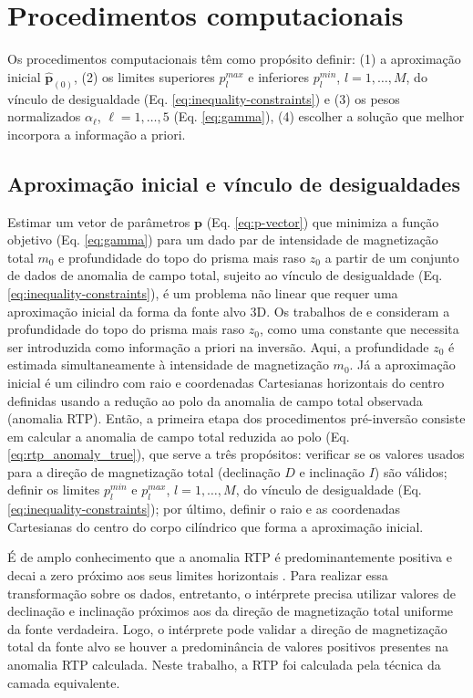 \chapter{Procedimentos computacionais}

Os procedimentos computacionais têm como propósito definir: (1) a aproximação inicial $ \hat{\mathbf{p}}_{(0)} $, (2) os limites superiores $ p_l^{max} $ e inferiores $ p_l^{min} $, $ l=1, \dots, M $, do vínculo de desigualdade (Eq. \ref{eq:inequality-constraints}) e (3) os pesos normalizados $ \alpha_{\ell} $, $ \ell=1,\dots,5 $ (Eq. \ref{eq:gamma}), (4) escolher a solução que melhor incorpora a informação a priori. 

\section{Aproximação inicial e vínculo de desigualdades}

Estimar um vetor de parâmetros $\mathbf{p}$ (Eq. \ref{eq:p-vector}) que minimiza a função objetivo (Eq. \ref{eq:gamma}) para um dado par de intensidade de magnetização total $ m_0 $ e profundidade do topo do prisma mais raso $ z_0 $ a partir de um conjunto de dados de anomalia de campo total, sujeito ao vínculo de desigualdade (Eq. \ref{eq:inequality-constraints}), é um problema não linear que requer uma aproximação inicial da forma da fonte alvo 3D. 
Os trabalhos de \cite{oliveirajr_etal2011} e \cite{oliveirajr_barbosa2013} consideram a profundidade do topo do prisma mais raso $ z_0 $, como uma constante que necessita ser introduzida como informação a priori na inversão.
Aqui, a profundidade $ z_0 $ é estimada simultaneamente à intensidade de magnetização $ m_0 $.
Já a aproximação inicial
é um cilindro com raio e coordenadas Cartesianas horizontais do centro definidas usando a redução ao polo da anomalia de campo total observada (anomalia RTP).
Então, a primeira etapa dos procedimentos pré-inversão consiste em calcular a anomalia de campo total reduzida ao polo (Eq. \ref{eq:rtp_anomaly_true}), que serve a três propósitos: verificar se os valores usados para a direção de magnetização total (declinação $D$ e inclinação $I$) são válidos; definir os limites $p_{l}^{min}$ e $p_{l}^{max}$, $ l=1, \dots, M $, do vínculo de desigualdade (Eq. \ref{eq:inequality-constraints}); por último, definir o raio e as coordenadas Cartesianas do centro do corpo cilíndrico que forma a aproximação inicial.

É de amplo conhecimento que a anomalia RTP é predominantemente positiva e decai a zero próximo aos seus limites horizontais \cite[por exemplo,][p. 331]{blakely1996}.
Para realizar essa transformação sobre os dados, entretanto, o intérprete precisa utilizar valores de declinação e inclinação próximos aos da direção de magnetização total uniforme da fonte verdadeira.
Logo, o intérprete pode validar a direção de magnetização total da fonte alvo se houver a predominância de valores positivos presentes na anomalia RTP calculada.
Neste trabalho, a RTP foi calculada pela técnica da camada equivalente.

